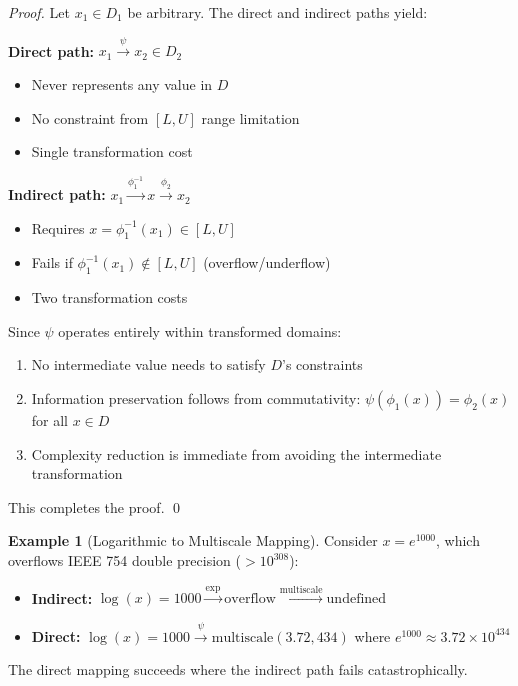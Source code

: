 \documentclass[11pt]{article}
\theoremstyle{definition}
\newtheorem{example}{Example}
\begin{document}
\begin{proof}
Let $x_1 \in D_1$ be arbitrary. The direct and indirect paths yield:

\textbf{Direct path:} $x_1 \xrightarrow{\psi} x_2 \in D_2$
\begin{itemize}
\item Never represents any value in $D$
\item No constraint from $[L, U]$ range limitation
\item Single transformation cost
\end{itemize}

\textbf{Indirect path:} $x_1 \xrightarrow{\phi_1^{-1}} x \xrightarrow{\phi_2} x_2$
\begin{itemize}
\item Requires $x = \phi_1^{-1}(x_1) \in [L, U]$
\item Fails if $\phi_1^{-1}(x_1) \notin [L, U]$ (overflow/underflow)
\item Two transformation costs
\end{itemize}

Since $\psi$ operates entirely within transformed domains:
\begin{enumerate}
\item No intermediate value needs to satisfy $D$'s constraints
\item Information preservation follows from commutativity: $\psi(\phi_1(x)) = \phi_2(x)$ for all $x \in D$
\item Complexity reduction is immediate from avoiding the intermediate transformation
\end{enumerate}
This completes the proof. \qed
\end{proof}

\begin{example}[Logarithmic to Multiscale Mapping]
Consider $x = e^{1000}$, which overflows IEEE 754 double precision ($> 10^{308}$):
\begin{itemize}
\item \textbf{Indirect:} $\log(x) = 1000 \xrightarrow{\exp} \text{overflow} \xrightarrow{\text{multiscale}} \text{undefined}$
\item \textbf{Direct:} $\log(x) = 1000 \xrightarrow{\psi} \text{multiscale}(3.72, 434)$ where $e^{1000} \approx 3.72 \times 10^{434}$
\end{itemize}
The direct mapping succeeds where the indirect path fails catastrophically.
\end{example}
\end{document}
